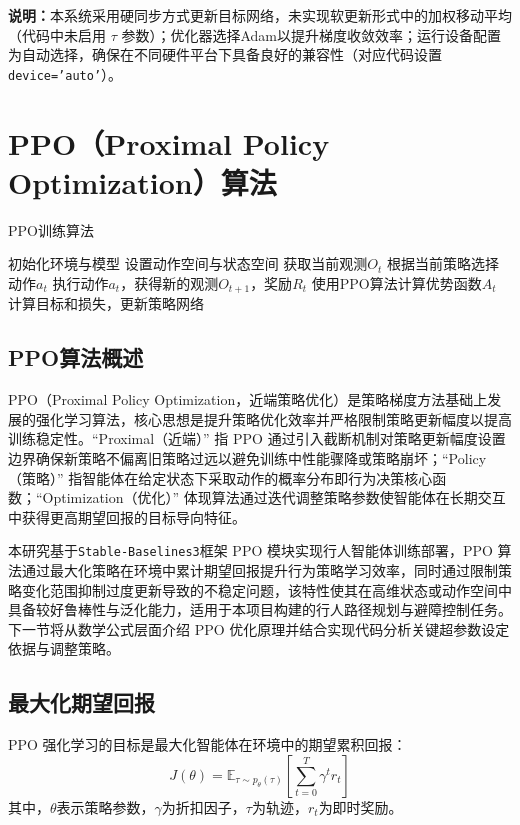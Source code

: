 \vspace{0.5em}
\noindent \textbf{说明：}本系统采用硬同步方式更新目标网络，未实现软更新形式中的加权移动平均（代码中未启用 $\tau$ 参数）；优化器选择Adam以提升梯度收敛效率；运行设备配置为自动选择，确保在不同硬件平台下具备良好的兼容性（对应代码设置 \texttt{device='auto'}）。

\section{PPO（Proximal Policy Optimization）算法}

\begin{algorithm}[H]
    \caption{PPO训练算法}
    \begin{algorithmic}[1]
    \STATE 初始化环境与模型
    \STATE 设置动作空间与状态空间
        \STATE 获取当前观测$O_t$
            \STATE 根据当前策略选择动作$a_t$
            \STATE 执行动作$a_t$，获得新的观测$O_{t+1}$，奖励$R_t$
            \STATE 使用PPO算法计算优势函数$A_t$
            \STATE 计算目标和损失，更新策略网络
        \ENDFOR
    \ENDWHILE
    \end{algorithmic}
\end{algorithm}

\subsection{PPO算法概述}

PPO（Proximal Policy Optimization，近端策略优化）是策略梯度方法基础上发展的强化学习算法，核心思想是提升策略优化效率并严格限制策略更新幅度以提高训练稳定性。“Proximal（近端）” 指 PPO 通过引入截断机制对策略更新幅度设置边界确保新策略不偏离旧策略过远以避免训练中性能骤降或策略崩坏；“Policy（策略）” 指智能体在给定状态下采取动作的概率分布即行为决策核心函数；“Optimization（优化）” 体现算法通过迭代调整策略参数使智能体在长期交互中获得更高期望回报的目标导向特征。

本研究基于\texttt{Stable-Baselines3}框架 PPO 模块实现行人智能体训练部署，PPO 算法通过最大化策略在环境中累计期望回报提升行为策略学习效率，同时通过限制策略变化范围抑制过度更新导致的不稳定问题，该特性使其在高维状态或动作空间中具备较好鲁棒性与泛化能力，适用于本项目构建的行人路径规划与避障控制任务。下一节将从数学公式层面介绍 PPO 优化原理并结合实现代码分析关键超参数设定依据与调整策略。

\subsection{最大化期望回报}
PPO 强化学习的目标是最大化智能体在环境中的期望累积回报：
\[
J(\theta) = \mathbb{E}_{\tau \sim p_{\theta}(\tau)} \left[ \sum_{t=0}^{T} \gamma^t r_t \right]
\]
其中，$\theta$表示策略参数，$\gamma$为折扣因子，$\tau$为轨迹，$r_t$为即时奖励。

